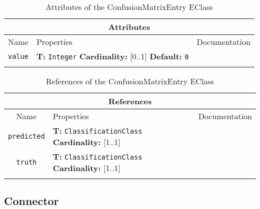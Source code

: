 \documentclass{article}
\begin{document}
\begin{table}[H]
\footnotesize
\begin{tabularx}{\textwidth}{|c| p{4 cm} | X |}
\hline
\multicolumn{3}{|c|}{\textbf{Attributes}} \\
\hline
Name & Properties & Documentation \\ \hline \hline
\texttt{value}
 & 
\textbf{T:} \texttt{Integer}
\newline
\textbf{Cardinality:} [0..1]
\newline
\textbf{Default:} \texttt{0}
 & \\ \hline
\caption{Attributes of the ConfusionMatrixEntry EClass}
\end{tabularx}
\label{e4smConfusionMatrixEntryattr}
\end{table}
\begin{table}[H]
\footnotesize
\begin{tabularx}{\textwidth}{|c| p{4 cm} | X |}
\hline
\multicolumn{3}{|c|}{\textbf{References}} \\
\hline
Name & Properties & Documentation \\ \hline \hline
\texttt{predicted}
 & 
\textbf{T:} \texttt{ClassificationClass}
\newline
\textbf{Cardinality:} [1..1]
 & \\ \hline
\texttt{truth}
 & 
\textbf{T:} \texttt{ClassificationClass}
\newline
\textbf{Cardinality:} [1..1]
 & \\ \hline
\caption{References of the ConfusionMatrixEntry EClass}
\end{tabularx}
\label{e4smConfusionMatrixEntryref}
\end{table}
\subsection[Connector]{Connector}
\label{e4smConnector}
\end{document}

